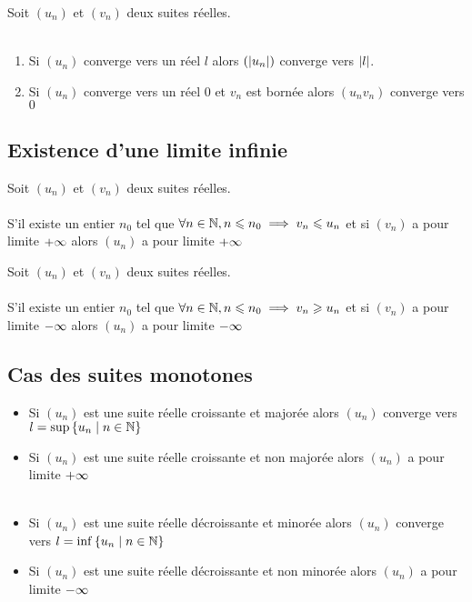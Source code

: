 \begin{defprop}[Conséquence]
    Soit \((u_n)\) et \((v_n)\) deux suites réelles. \\~\\
    \begin{enumerate}
        \item Si \((u_n)\) converge vers un réel \(l\) alors \((\left\lvert u_n\right\rvert)\) converge vers \(\left\lvert l\right\rvert\).
        \item Si \((u_n)\) converge vers un réel \(0\) et \(v_n\) est bornée alors \((u_n v_n)\) converge vers \(0\)
    \end{enumerate}
\end{defprop}

\subsection{Existence d'une limite infinie}
\begin{theo}
    Soit \((u_n)\) et \((v_n)\) deux suites réelles.\\~\\
    S'il existe un entier \(n_0\) tel que \(\forall n \in \mathbb{N}, n \leqslant n_0 \implies v_n\leqslant u_n\) et si \((v_n)\) a pour limite \(+\infty\) alors \((u_n)\) a pour limite \(+\infty\)
\end{theo}

\begin{theo}
    Soit \((u_n)\) et \((v_n)\) deux suites réelles.\\~\\
    S'il existe un entier \(n_0\) tel que \(\forall n \in \mathbb{N}, n \leqslant n_0 \implies v_n\geqslant u_n\) et si \((v_n)\) a pour limite \(-\infty\) alors \((u_n)\) a pour limite \(-\infty\)
\end{theo}

\subsection{Cas des suites monotones}
\begin{theo}
    \begin{itemize}
        \item Si \((u_n)\) est une suite réelle croissante et majorée alors \((u_n)\) converge vers \(l = \sup \left\lbrace u_n \;\middle|\; n \in \mathbb{N}\right\rbrace\)
        \item Si \((u_n)\) est une suite réelle croissante et non majorée alors \((u_n)\) a pour limite \(+\infty\)\\~\\
        
        \item Si \((u_n)\) est une suite réelle décroissante et minorée alors \((u_n)\) converge vers \(l = \inf \left\lbrace u_n \;\middle|\; n \in \mathbb{N}\right\rbrace\)
        \item Si \((u_n)\) est une suite réelle décroissante et non minorée alors \((u_n)\) a pour limite \(-\infty\)
    \end{itemize}
\end{theo}

